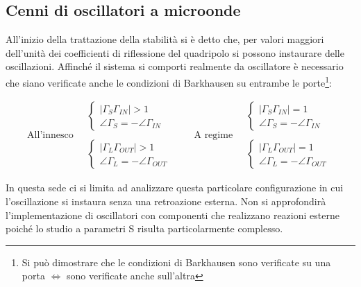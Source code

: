 \subsection{Cenni di oscillatori a microonde}

All'inizio della trattazione della stabilità si è detto che, per valori maggiori dell'unità dei coefficienti di riflessione del quadripolo si possono instaurare delle oscillazioni. Affinché il sistema si comporti realmente da oscillatore è necessario che siano verificate anche le condizioni di Barkhausen su entrambe le porte\footnote{Si può dimostrare che le condizioni di Barkhausen sono verificate su una porta $\Leftrightarrow$ sono verificate anche sull'altra}:

\[
\mbox{All'innesco}
\quad
\begin{array}{l}
\begin{cases}
|\Gamma_S \Gamma_{IN}| > 1\\
\angle\Gamma_S = -\angle\Gamma_{IN}
\end{cases}
\\\\
\begin{cases}
|\Gamma_L \Gamma_{OUT}| > 1\\
\angle\Gamma_L = -\angle\Gamma_{OUT}
\end{cases}
\end{array}
\qquad
\mbox{A regime}
\quad
\begin{array}{l}
\begin{cases}
|\Gamma_S \Gamma_{IN}| = 1\\
\angle\Gamma_S = -\angle\Gamma_{IN}
\end{cases}
\\\\
\begin{cases}
|\Gamma_L \Gamma_{OUT}| = 1\\
\angle\Gamma_L = -\angle\Gamma_{OUT}
\end{cases}
\end{array}
\]

In questa sede ci si limita ad analizzare questa particolare configurazione in cui l'oscillazione si instaura senza una retroazione esterna. Non si approfondirà l'implementazione di oscillatori con componenti che realizzano reazioni esterne poiché lo studio a parametri S risulta particolarmente complesso.

